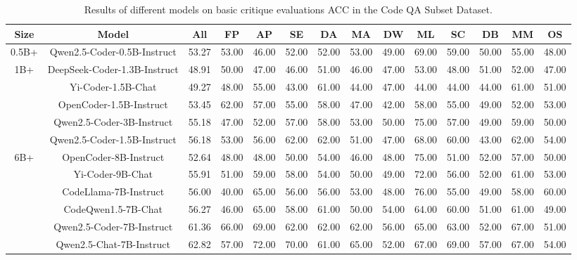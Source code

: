 \documentclass[11pt, a4paper, logo, copyright, nonumbering, amsart]{map}
\begin{document}
\begin{CJK*}{UTF8}{gbsn}
\begin{table*}[h!]
    \centering
    \caption{Results of different models on basic critique evaluations ACC in the Code QA Subset Dataset.} \label{table:real_level1}
    \begin{adjustbox}{width=\textwidth}
    \begin{tabular}{c|c|cccccccccccc}
    
    \toprule
    \textbf{Size} & \textbf{Model} & \textbf{All} & \textbf{FP} & \textbf{AP} & \textbf{SE} & \textbf{DA} & \textbf{MA} & \textbf{DW} & \textbf{ML} & \textbf{SC} & \textbf{DB} & \textbf{MM} & \textbf{OS} \\
    
    \midrule
    0.5B+ & Qwen2.5-Coder-0.5B-Instruct & 53.27 & 53.00 & 46.00 & 52.00 & 52.00 & 53.00 & 49.00 & 69.00 & 59.00 & 50.00 & 55.00 & 48.00 \\

    \midrule
    \multirow{5}{*}{1B+} 
    & DeepSeek-Coder-1.3B-Instruct & 48.91 & 50.00 & 47.00 & 46.00 & 51.00 & 46.00 & 47.00 & 53.00 & 48.00 & 51.00 & 52.00 & 47.00 \\
    & Yi-Coder-1.5B-Chat & 49.27 & 48.00 & 55.00 & 43.00 & 61.00 & 44.00 & 47.00 & 44.00 & 44.00 & 44.00 & 61.00 & 51.00 \\
    & OpenCoder-1.5B-Instruct & 53.45 & 62.00 & 57.00 & 55.00 & 58.00 & 47.00 & 42.00 & 58.00 & 55.00 & 49.00 & 52.00 & 53.00 \\
    & Qwen2.5-Coder-3B-Instruct & 55.18 & 47.00 & 52.00 & 57.00 & 58.00 & 53.00 & 50.00 & 75.00 & 57.00 & 49.00 & 59.00 & 50.00 \\
    & Qwen2.5-Coder-1.5B-Instruct & 56.18 & 53.00 & 56.00 & 62.00 & 62.00 & 51.00 & 47.00 & 68.00 & 60.00 & 43.00 & 62.00 & 54.00 \\
    
    \midrule
    \multirow{6}{*}{6B+} 
    & OpenCoder-8B-Instruct & 52.64 & 48.00 & 48.00 & 50.00 & 54.00 & 46.00 & 48.00 & 75.00 & 51.00 & 52.00 & 57.00 & 50.00 \\
    & Yi-Coder-9B-Chat & 55.91 & 51.00 & 59.00 & 58.00 & 54.00 & 50.00 & 49.00 & 72.00 & 56.00 & 52.00 & 61.00 & 53.00 \\
    & CodeLlama-7B-Instruct & 56.00 & 40.00 & 65.00 & 56.00 & 56.00 & 53.00 & 48.00 & 76.00 & 55.00 & 49.00 & 58.00 & 60.00 \\
    & CodeQwen1.5-7B-Chat & 56.27 & 46.00 & 65.00 & 58.00 & 61.00 & 50.00 & 54.00 & 64.00 & 60.00 & 51.00 & 61.00 & 49.00 \\
    & Qwen2.5-Coder-7B-Instruct & 61.36 & 66.00 & 69.00 & 62.00 & 62.00 & 62.00 & 56.00 & 65.00 & 63.00 & 52.00 & 67.00 & 51.00 \\
    & Qwen2.5-Chat-7B-Instruct & 62.82 & 57.00 & 72.00 & 70.00 & 61.00 & 65.00 & 52.00 & 67.00 & 69.00 & 57.00 & 67.00 & 54.00 \\
    

\end{tabular}
\end{adjustbox}
\end{table*}
\end{CJK*}
\end{document}
